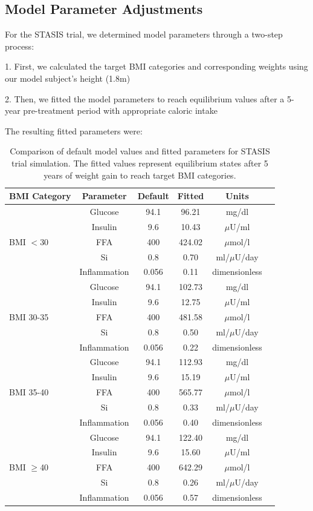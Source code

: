 \subsection{Model Parameter Adjustments}
For the STASIS trial, we determined model parameters through a two-step process:

1. First, we calculated the target BMI categories and corresponding weights using our model subject's height (1.8m)

2. Then, we fitted the model parameters to reach equilibrium values after a 5-year pre-treatment period with appropriate caloric intake

The resulting fitted parameters were:

\begin{table}[h]
\centering
\begin{tabular}{|l|c|c|c|c|c|}
\hline
\textbf{BMI Category} & \textbf{Parameter} & \textbf{Default} & \textbf{Fitted} & \textbf{Units} \\
\hline
\multirow{5}{*}{BMI $<$30} & Glucose & 94.1 & 96.21 & mg/dl \\
& Insulin & 9.6 & 10.43 & $\mu$U/ml \\
& FFA & 400 & 424.02 & $\mu$mol/l \\
& Si & 0.8 & 0.70 & ml/$\mu$U/day \\
& Inflammation & 0.056 & 0.11 & dimensionless \\
\hline
\multirow{5}{*}{BMI 30-35} & Glucose & 94.1 & 102.73 & mg/dl \\
& Insulin & 9.6 & 12.75 & $\mu$U/ml \\
& FFA & 400 & 481.58 & $\mu$mol/l \\
& Si & 0.8 & 0.50 & ml/$\mu$U/day \\
& Inflammation & 0.056 & 0.22 & dimensionless \\
\hline
\multirow{5}{*}{BMI 35-40} & Glucose & 94.1 & 112.93 & mg/dl \\
& Insulin & 9.6 & 15.19 & $\mu$U/ml \\
& FFA & 400 & 565.77 & $\mu$mol/l \\
& Si & 0.8 & 0.33 & ml/$\mu$U/day \\
& Inflammation & 0.056 & 0.40 & dimensionless \\
\hline
\multirow{5}{*}{BMI $\geq$40} & Glucose & 94.1 & 122.40 & mg/dl \\
& Insulin & 9.6 & 15.60 & $\mu$U/ml \\
& FFA & 400 & 642.29 & $\mu$mol/l \\
& Si & 0.8 & 0.26 & ml/$\mu$U/day \\
& Inflammation & 0.056 & 0.57 & dimensionless \\
\hline
\end{tabular}
\caption{Comparison of default model values and fitted parameters for STASIS trial simulation. The fitted values represent equilibrium states after 5 years of weight gain to reach target BMI categories.}
\end{table}


